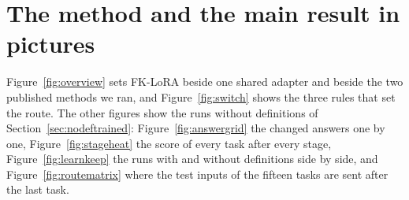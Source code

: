 \section{The method and the main result in pictures}
\label{app:pictures}

Figure~\ref{fig:overview} sets FK-LoRA beside one shared adapter and beside the two published
methods we ran, and Figure~\ref{fig:switch} shows the three rules that set the route. The other
figures show the runs without definitions of Section~\ref{sec:nodeftrained}:
Figure~\ref{fig:answergrid} the changed answers one by one, Figure~\ref{fig:stageheat} the score of
every task after every stage, Figure~\ref{fig:learnkeep} the runs with and without definitions side
by side, and Figure~\ref{fig:routematrix} where the test inputs of the fifteen tasks are sent after
the last task.



